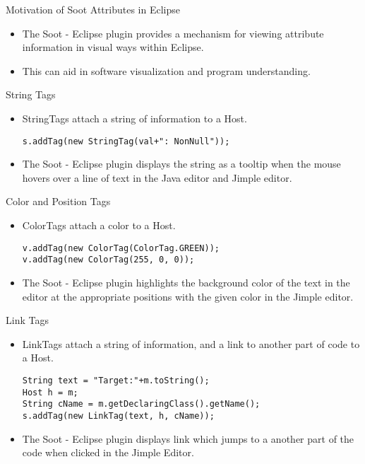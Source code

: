 \begin{slide}{Motivation of Soot Attributes in Eclipse}
\begin{itemize}
\item The Soot - Eclipse plugin provides a mechanism for viewing
attribute information in visual ways within Eclipse.
\item This can aid in software visualization and program understanding.
\end{itemize}
\end{slide}

\begin{slide}{String Tags}
\begin{itemize}
\item {\red StringTag}s attach a string of information to a {\red Host}.
{\tiny
\begin{verbatim}
s.addTag(new StringTag(val+": NonNull"));
\end{verbatim}
}
\item The Soot - Eclipse plugin displays the string as a tooltip when the mouse hovers over a line of text in the Java editor and Jimple editor.
\end{itemize}
\end{slide}

\begin{slide}{Color and Position Tags}
\begin{itemize}
\item {\red ColorTag}s attach a color to a {\red Host}.
{\tiny
\begin{verbatim}
v.addTag(new ColorTag(ColorTag.GREEN));
v.addTag(new ColorTag(255, 0, 0));
\end{verbatim}
}
\item The Soot - Eclipse plugin highlights the background color of the text in the editor at the appropriate positions with the given color in the Jimple editor.
\end{itemize}
\end{slide}

\begin{slide}{Link Tags}
\begin{itemize}
\item {\red LinkTag}s attach a string of information, and a link to another part of code to a {\red Host}.
{\tiny
\begin{verbatim}
String text = "Target:"+m.toString();
Host h = m;
String cName = m.getDeclaringClass().getName();
s.addTag(new LinkTag(text, h, cName));
\end{verbatim}
}
\item The Soot - Eclipse plugin displays link which jumps to a another part of the code when clicked in the Jimple Editor.
\end{itemize}
\end{slide}

